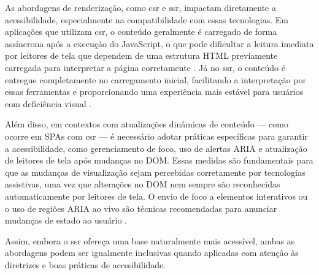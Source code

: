 As abordagens de renderização, como \acrshort{csr} e \acrshort{ssr}, impactam diretamente a acessibilidade, especialmente na compatibilidade com essas tecnologias. Em aplicações que utilizam \acrshort{csr}, o conteúdo geralmente é carregado de forma assíncrona após a execução do JavaScript, o que pode dificultar a leitura imediata por leitores de tela que dependem de uma estrutura HTML previamente carregada para interpretar a página corretamente \cite{pixelfree2023access}. Já no \acrshort{ssr}, o conteúdo é entregue completamente no carregamento inicial, facilitando a interpretação por essas ferramentas e proporcionando uma experiência mais estável para usuários com deficiência visual \cite{atori2024}.

Além disso, em contextos com atualizações dinâmicas de conteúdo — como ocorre em SPAs com \acrshort{csr} — é necessário adotar práticas específicas para garantir a acessibilidade, como gerenciamento de foco, uso de alertas ARIA e atualização de leitores de tela após mudanças no DOM. Essas medidas são fundamentais para que as mudanças de visualização sejam percebidas corretamente por tecnologias assistivas, uma vez que alterações no DOM nem sempre são reconhecidas automaticamente por leitores de tela. O envio de foco a elementos interativos ou o uso de regiões ARIA ao vivo são técnicas recomendadas para anunciar mudanças de estado ao usuário \cite{sutton2018}.

Assim, embora o \acrshort{ssr} ofereça uma base naturalmente mais acessível, ambas as abordagens podem ser igualmente inclusivas quando aplicadas com atenção às diretrizes e boas práticas de acessibilidade.


